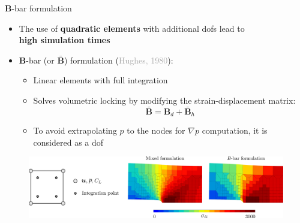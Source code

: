 \documentclass[9pt]{beamer}
\begin{document}

\begin{frame}{$\boldsymbol{B}$-bar formulation}
    
	\begin{itemize}
		\item The use of \textbf{quadratic elements} with additional dofs lead to \\ \textbf{high simulation times}
		\vspace{0.25cm}
		\item $\boldsymbol{B}$-bar (or $\boldsymbol{\bar{B}}$) formulation (\textcolor{darkgray}{Hughes, 1980}): 
		\vspace{0.25cm}
		\begin{itemize}
			\item Linear elements with full integration
			\vspace{0.25cm}
			\item Solves volumetric locking by modifying the strain-displacement matrix: \\
			$$\boldsymbol{\bar{B}} = \boldsymbol{B}_d + \boldsymbol{\bar{B}}_h$$
			\vspace{0.05cm}
			\item To avoid extrapolating $p$ to the nodes for $\nabla p$ computation, it is considered as a dof
		\end{itemize}
	\end{itemize}	
	
	\vspace{0.25cm}	
	
	\begin{figure}
        \centering
        \includegraphics[width=1.\textwidth]{Images/comp_nlgeom-3f_B-bar.pdf}
    \end{figure}  
    
    
\end{frame}
\end{document}

